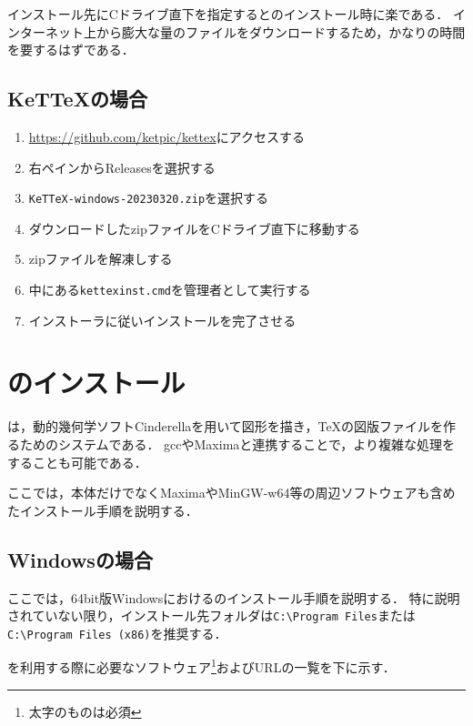 インストール先にCドライブ直下を指定すると{\ketcindy}のインストール時に楽である．
インターネット上から膨大な量のファイルをダウンロードするため，かなりの時間を要するはずである．

\subsection{KeT{\TeX}の場合}

\begin{enumerate}
    \item \url{https://github.com/ketpic/kettex}にアクセスする
    \item 右ペインからReleasesを選択する
    \item \verb|KeTTeX-windows-20230320.zip|を選択する
    \item ダウンロードしたzipファイルをCドライブ直下に移動する
    \item zipファイルを解凍しする
    \item 中にある\verb|kettexinst.cmd|を管理者として実行する
    \item インストーラに従いインストールを完了させる
\end{enumerate}

\section{{\ketcindy}のインストール}

{\ketcindy}は，動的幾何学ソフトCinderellaを用いて図形を描き，{\TeX}の図版ファイルを作るためのシステムである．
gccやMaximaと連携することで，より複雑な処理をすることも可能である．

ここでは，{\ketcindy}本体だけでなくMaximaやMinGW-w64等の周辺ソフトウェアも含めたインストール手順を説明する．

\subsection{Windowsの場合}

ここでは，64bit版Windowsにおける{\ketcindy}のインストール手順を説明する．
特に説明されていない限り，インストール先フォルダは\verb|C:\Program Files|または\verb|C:\Program Files (x86)|を推奨する．

{\ketcindy}を利用する際に必要なソフトウェア\footnote{太字のものは必須}およびURLの一覧を下に示す．

